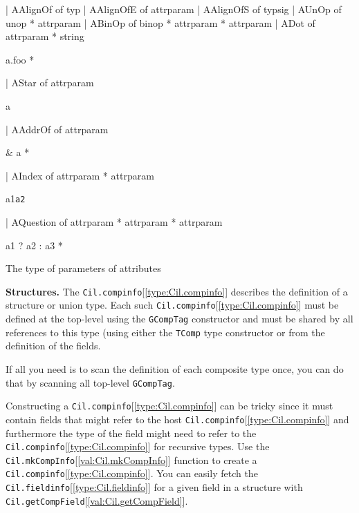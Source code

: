 \documentclass[11pt]{article}
\begin{document}
\begin{ocamldoccode}
  | AAlignOf of typ
  | AAlignOfE of attrparam
  | AAlignOfS of typsig
  | AUnOp of unop * attrparam
  | ABinOp of binop * attrparam * attrparam
  | ADot of attrparam * string
\end{ocamldoccode}
\begin{ocamldoccomment}
a.foo *
\end{ocamldoccomment}
\begin{ocamldoccode}
  | AStar of attrparam
\end{ocamldoccode}
\begin{ocamldoccomment}
 a
\end{ocamldoccomment}
\begin{ocamldoccode}
  | AAddrOf of attrparam
\end{ocamldoccode}
\begin{ocamldoccomment}
\& a *
\end{ocamldoccomment}
\begin{ocamldoccode}
  | AIndex of attrparam * attrparam
\end{ocamldoccode}
\begin{ocamldoccomment}
a1{\tt{a2}}
\end{ocamldoccomment}
\begin{ocamldoccode}
  | AQuestion of attrparam * attrparam * attrparam
\end{ocamldoccode}
\begin{ocamldoccomment}
a1 ? a2 : a3 *
\end{ocamldoccomment}
\begin{ocamldocdescription}
The type of parameters of attributes


\end{ocamldocdescription}




{\bf Structures.} The {\tt{Cil.compinfo}}[\ref{type:Cil.compinfo}] describes the definition of a 
 structure or union type. Each such {\tt{Cil.compinfo}}[\ref{type:Cil.compinfo}] must be defined at the 
 top-level using the {\tt{GCompTag}} constructor and must be shared by all 
 references to this type (using either the {\tt{TComp}} type constructor or from 
 the definition of the fields. 


   If all you need is to scan the definition of each 
 composite type once, you can do that by scanning all top-level {\tt{GCompTag}}. 


 Constructing a {\tt{Cil.compinfo}}[\ref{type:Cil.compinfo}] can be tricky since it must contain fields 
 that might refer to the host {\tt{Cil.compinfo}}[\ref{type:Cil.compinfo}] and furthermore the type of 
 the field might need to refer to the {\tt{Cil.compinfo}}[\ref{type:Cil.compinfo}] for recursive types. 
 Use the {\tt{Cil.mkCompInfo}}[\ref{val:Cil.mkCompInfo}] function to create a {\tt{Cil.compinfo}}[\ref{type:Cil.compinfo}]. You can 
 easily fetch the {\tt{Cil.fieldinfo}}[\ref{type:Cil.fieldinfo}] for a given field in a structure with 
 {\tt{Cil.getCompField}}[\ref{val:Cil.getCompField}].
\end{document}
